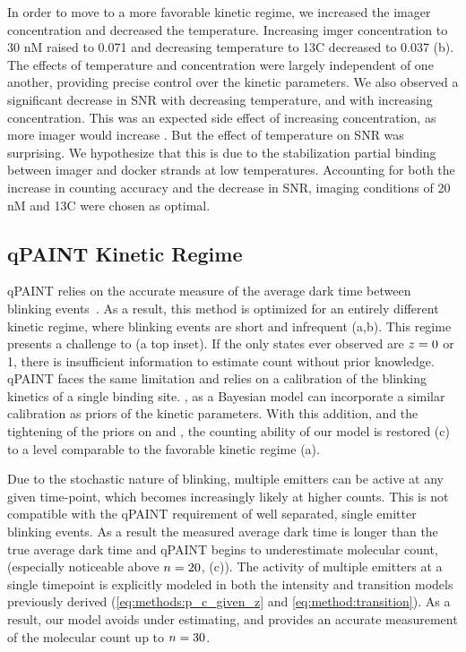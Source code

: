 In order to move to a more favorable kinetic regime, 
we increased the imager concentration and decreased the temperature.
	Increasing imger concentration to 30 nM raised \pon to 0.071 and 
	decreasing temperature to 13\textdegree C decreased \poff to 0.037 
	(b).
	The effects of temperature and concentration were largely independent 
	of one another, providing precise control over the kinetic parameters. %
	We also observed a significant decrease in SNR with decreasing temperature, 
	and with increasing concentration. 
	This was an expected side effect of increasing concentration, as more imager would increase \rb.
	But the effect of temperature on SNR was surprising. 
	We hypothesize that this is due to the stabilization partial 
	binding between imager and docker strands at low temperatures.
	Accounting for both the increase in counting accuracy and the decrease 
	in SNR, imaging conditions of 20 nM and 13\textdegree C were chosen as optimal.

\subsection{qPAINT Kinetic Regime}
qPAINT relies on the accurate measure of the average dark time between blinking events~\citep{jungmann_2016}. 
	As a result, this method is optimized for an entirely different kinetic regime, where blinking 
	events are short and infrequent (a,b).
	This regime presents a challenge to \ours (a top inset). 
	If the only states ever observed are $z_{}=0$ or 1, there is insufficient 
	information to estimate count without prior knowledge.
	qPAINT faces the same limitation and relies on a calibration 
	of the blinking kinetics of a single binding site.
	\ours, as a Bayesian model can incorporate a similar calibration 
	as priors of the kinetic parameters.
	With this addition, and the tightening of the priors on \re and \rb, the counting 
	ability of our model is restored (c) to 
	a level comparable to the favorable kinetic regime (a).

Due to the stochastic nature of blinking, multiple emitters can 
be active at any given time-point, which becomes increasingly likely at higher counts.
	This is not compatible with the qPAINT requirement of well separated, 
	single emitter blinking events.
	As a result the measured average dark time is longer than the true average dark time
	and  qPAINT begins to underestimate molecular count, 
	(especially noticeable above $n=20$, (c)). 
	The activity of multiple emitters at a single timepoint is explicitly modeled in both the 
	intensity and transition models previously derived (\eqref{eq:methods:p_c_given_z} and \eqref{eq:method:transition}). 
	As a result, our model avoids under estimating, and provides an accurate measurement 
	of the molecular count up to $n=30$.
	
